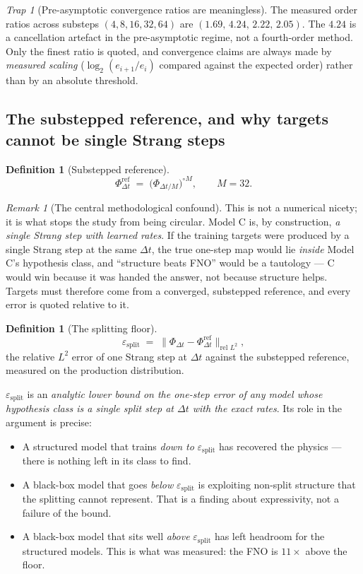 \documentclass[11pt,a4paper]{article}
\theoremstyle{plain}
\theoremstyle{definition}
\newtheorem{definition}[theorem]{Definition}
\theoremstyle{remark}
\newtheorem{remark}[theorem]{Remark}
\newtheorem{trap}[theorem]{Trap}
\newcommand{\dt}{\Delta t}
\newcommand{\epssplit}{\varepsilon_{\mathrm{split}}}
\newcommand{\Flow}{\Phi}
\begin{document}
\begin{trap}[Pre-asymptotic convergence ratios are meaningless]
The measured order ratios across substeps $(4,8,16,32,64)$ are
$(1.69,\,4.24,\,2.22,\,2.05)$. The $4.24$ is a cancellation artefact in the
pre-asymptotic regime, not a fourth-order method. Only the finest ratio is quoted, and
convergence claims are always made by \emph{measured scaling}
($\log_2(e_{i+1}/e_i)$ compared against the expected order) rather than by an absolute
threshold.
\end{trap}

\subsection{The substepped reference, and why targets cannot be single Strang steps}
\label{sec:substepped}

\begin{definition}[Substepped reference]
\[
\Flow^{\mathrm{ref}}_{\dt} \;=\; \bigl(\Flow_{\dt/M}\bigr)^{\circ M},\qquad M = 32 .
\]
\end{definition}

\begin{remark}[The central methodological confound]
\label{rem:tautology}
This is not a numerical nicety; it is what stops the study from being circular. Model C
is, by construction, \emph{a single Strang step with learned rates}. If the training
targets were produced by a single Strang step at the same $\dt$, the true one-step map
would lie \emph{inside} Model C's hypothesis class, and ``structure beats FNO'' would be
a tautology --- C would win because it was handed the answer, not because structure
helps. Targets must therefore come from a converged, substepped reference, and every
error is quoted relative to it.
\end{remark}

\begin{definition}[The splitting floor]
\label{def:epssplit}
\[
\epssplit \;=\; \bigl\| \Flow_{\dt} - \Flow^{\mathrm{ref}}_{\dt}\bigr\|_{\text{rel }L^2},
\]
the relative $L^2$ error of one Strang step at $\dt$ against the substepped reference,
measured on the production distribution.
\end{definition}

$\epssplit$ is an \emph{analytic lower bound on the one-step error of any model whose
hypothesis class is a single split step at $\dt$ with the exact rates}. Its role in the
argument is precise:

\begin{itemize}[leftmargin=1.3em,itemsep=0.2em]
\item A structured model that trains \emph{down to} $\epssplit$ has recovered the physics
--- there is nothing left in its class to find.
\item A black-box model that goes \emph{below} $\epssplit$ is exploiting non-split
structure that the splitting cannot represent. That is a finding about expressivity, not
a failure of the bound.
\item A black-box model that sits well \emph{above} $\epssplit$ has left headroom for the
structured models. This is what was measured: the FNO is $11\times$ above the floor.
\end{itemize}
\end{document}
